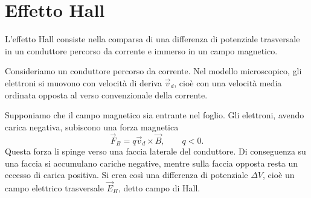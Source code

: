 \documentclass[a4paper]{article}
\begin{document}
\section{Effetto Hall}

L'effetto Hall consiste nella comparsa di una differenza di potenziale trasversale in un conduttore percorso da corrente e immerso in un campo magnetico.

Consideriamo un conduttore percorso da corrente. Nel modello microscopico, gli elettroni si muovono con velocità di deriva \(\vec{v}_d\), cioè con una velocità media ordinata opposta al verso convenzionale della corrente.

\begin{center}
\end{center}

Supponiamo che il campo magnetico sia entrante nel foglio. Gli elettroni, avendo carica negativa, subiscono una forza magnetica
\[
    \vec{F}_B = q\vec{v}_d\times\vec{B}, \qquad q<0.
\]
Questa forza li spinge verso una faccia laterale del conduttore. Di conseguenza su una faccia si accumulano cariche negative, mentre sulla faccia opposta resta un eccesso di carica positiva. Si crea così una differenza di potenziale \(\Delta V\), cioè un campo elettrico trasversale \(\vec{E}_H\), detto campo di Hall.
\end{document}
